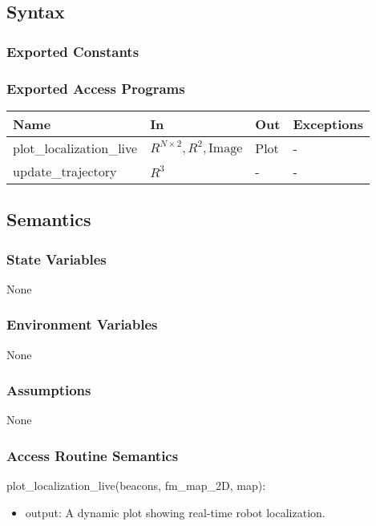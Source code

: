 \documentclass[12pt, titlepage]{article}
\begin{document}
\subsection{Syntax}

\subsubsection{Exported Constants}

\subsubsection{Exported Access Programs}

\begin{center}
\begin{tabular}{p{4cm} p{4cm} p{4cm} p{2cm}}
\hline
\textbf{Name} & \textbf{In} & \textbf{Out} & \textbf{Exceptions} \\
\hline
plot\_localization\_live & \( R^{N \times 2}, R^2, \text{Image} \) & Plot & - \\
\hline
update\_trajectory & \( R^3 \) & - & - \\
\hline
\end{tabular}
\end{center}

\subsection{Semantics}

\subsubsection{State Variables}
None

\subsubsection{Environment Variables}
None

\subsubsection{Assumptions}
None

\subsubsection{Access Routine Semantics}

\noindent plot\_localization\_live(beacons, fm\_map\_2D, map):
\begin{itemize}
\item output: A dynamic plot showing real-time robot localization.
\end{itemize}
\end{document}
